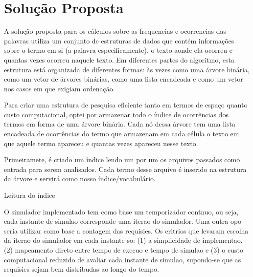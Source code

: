 \documentclass[12pt]{article}
\begin{document}
\section{Solução Proposta}
\label{solucao_proposta}

A solução proposta para os cálculos sobre as frequencias e ocorrencias das
palavras utiliza um conjunto de estruturas de dados que contém informações sobre
o termo em si (a palavra especificamente), o texto aonde ela ocorreu e quantas
vezes ocorreu naquele texto. Em diferentes partes do algoritmo, esta estrutura está
organizada de diferentes formas: às vezes como uma árvore binária, como um vetor
de árvores binárias, como uma lista encadeada e como um vetor nos casos em que
exigiam ordenação.

Para criar uma estrutura de pesquisa eficiente tanto em termos de espaço quanto
custo computacional, optei por armazenar todo o índice de ocorrências dos termos
em forma de uma árvore binária. Cada nó dessa árvore tem uma lista encadeada de
ocorrências do termo que armazenam em cada célula o texto em que aquele termo
apareceu e quantas vezes apareceu nesse texto.

Primeiramete, é criado um índice lendo um por um os arquivos passados como
entrada para serem analisados. Cada termo desse arquivo é inserido na estrutura
da árvore e servirá como nosso índice/vocabulário.

\begin{algorithm}[H]
\begin{footnotesize}
\caption{Leitura do índice}
\end{footnotesize}
\end{algorithm}




O simulador implementado tem como base um temporizador contnuo, ou seja, cada instante 
de simulao corresponde  uma iterao do simulador. Uma outra opo seria utilizar como base 
a contagem das requisies. Os critrios que levaram  escolha da iterao do simulador em 
cada instante so: (1) a simplicidade de implementao, (2) mapeamento direto entre tempo 
de execuo e tempo de simulao e (3) o custo computacional reduzido de avaliar cada instante 
de simulao, supondo-se que as requisies sejam bem distribudas ao longo do tempo.
\end{document}
